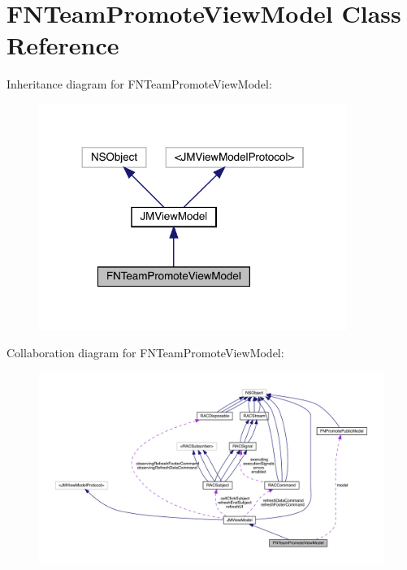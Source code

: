 \hypertarget{interface_f_n_team_promote_view_model}{}\section{F\+N\+Team\+Promote\+View\+Model Class Reference}
\label{interface_f_n_team_promote_view_model}


Inheritance diagram for F\+N\+Team\+Promote\+View\+Model\+:\nopagebreak
\begin{figure}[H]
\begin{center}
\leavevmode
\includegraphics[width=284pt]{interface_f_n_team_promote_view_model__inherit__graph}
\end{center}
\end{figure}


Collaboration diagram for F\+N\+Team\+Promote\+View\+Model\+:\nopagebreak
\begin{figure}[H]
\begin{center}
\leavevmode
\includegraphics[width=350pt]{interface_f_n_team_promote_view_model__coll__graph}
\end{center}
\end{figure}
